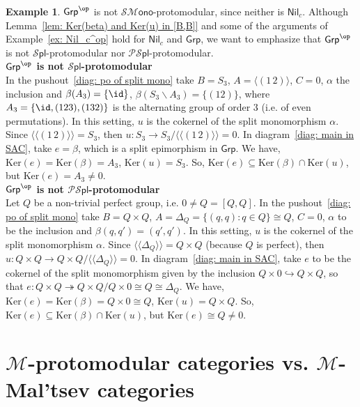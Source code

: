\documentclass[11pt]{amsart}
\theoremstyle{plain}
\theoremstyle{definition}
\newtheorem{example}[subsection]{Example}
\theoremstyle{remark}
\newcommand{\Grp}{\ensuremath{\mathsf{Grp}}}
\newcommand{\Nil}{\ensuremath{\mathsf{Nil}}}
\newcommand{\M}{\ensuremath{\mathscr{M}}}
\newcommand{\la}{\langle}
\newcommand{\ra}{\rangle}
\newcommand{\SMono}{\ensuremath{\mathscr{SM}\mathsf{ono}}}
\newcommand{\Spl}{\ensuremath{\mathscr{S}\mathsf{pl}}}
\newcommand{\PSpl}{\ensuremath{\mathscr{PS}\mathsf{pl}}}
\newcommand{\Ker}{\ensuremath{\mathrm{Ker}}}
\begin{document}
\begin{example}\label{ex: Grp^op} $\Grp^\op$ is not $\SMono$-protomodular, since neither is $\Nil_c$. Although Lemma~\ref{lem: Ker(beta) and Ker(u) in [B,B]} and some of the arguments of Example~\ref{ex: Nil_c^op} hold for $\Nil_c$ and $\Grp$, we want to emphasize that $\Grp^\op$ is not $\Spl$-protomodular nor $\PSpl$-protomodular. \\
\noindent\textbf{$\Grp^\op$ is not $\Spl$-protomodular}\\
In the pushout~\eqref{diag: po of split mono} take $B=S_3$, $A=\la (1\, 2)\ra$, $C=0$, $\alpha$ the inclusion and $\beta(A_3)=\{\id\}$, $\beta(S_3\backslash A_3)=\{(12)\}$, where $A_3=\{\id, (123),(132)\}$ is the alternating group of order 3 (i.e. of even permutations). In this setting, $u$ is the cokernel of the split monomorphism $\alpha$. Since $\la\la (1\,2)\ra\ra=S_3$, then $u\colon S_3\to S_3/\la\la (1\,2)\ra\ra=0$. In diagram~\eqref{diag: main in SAC}, take $e=\beta$, which is a split epimorphism in $\Grp$. We have, $\Ker(e)=\Ker(\beta)=A_3$, $\Ker(u)=S_3$. So, $\Ker(e)\subseteq \Ker(\beta)\cap \Ker(u)$, but $\Ker(e)=A_3\neq 0$.\\
\noindent\textbf{$\Grp^\op$ is not $\PSpl$-protomodular}\\
Let $Q$ be a non-trivial perfect group, i.e. $0\neq Q=[Q,Q]$. In the pushout~\eqref{diag: po of split mono} take $B=Q\times Q$, $A=\Delta_Q=\{(q,q):q\in Q\}\cong Q$, $C=0$, $\alpha$ to be the inclusion and $\beta(q,q')=(q',q')$. In this setting, $u$ is the cokernel of the split monomorphism $\alpha$. Since $\la\la \Delta_Q\ra\ra=Q\times Q$ (because $Q$ is perfect), then $u\colon Q\times Q\to Q\times Q/\la\la \Delta_Q\ra\ra=0$. In diagram~\eqref{diag: main in SAC}, take $e$ to be the cokernel of the split monomorphism given by the inclusion $Q\times 0 \hookrightarrow Q\times Q$, so that $e\colon Q\times Q \twoheadrightarrow Q\times Q/Q\times 0\cong Q\cong \Delta_Q$. We have, $\Ker(e)=\Ker(\beta)= Q\times 0\cong Q$, $\Ker(u)=Q\times Q$. So, $\Ker(e)\subseteq \Ker(\beta)\cap \Ker(u)$, but $\Ker(e)\cong Q\neq 0$.
\end{example}

\section{$\M$-protomodular categories vs. $\M$-Mal'tsev categories}\label{sec: M-proto vs M-Mal'tsev}
\end{document}

